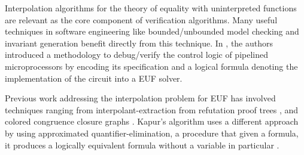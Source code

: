 Interpolation algorithms for the theory of equality 
with uninterpreted functions are relevant as the core 
component of verification algorithms. Many useful techniques 
in software engineering like bounded/unbounded model 
checking and invariant generation benefit directly from 
this technique. In \cite{10.1007/3-540-58179-0_44}, the 
authors introduced a methodology to debug/verify the 
control logic of pipelined microprocessors by encoding 
its specification and a logical formula denoting the 
implementation of the circuit into a EUF solver.

Previous work addressing the interpolation problem for 
EUF has involved techniques ranging from
interpolant-extraction from refutation proof 
trees \cite{10.1007/978-3-540-24730-2_2, mcmillan2011interpolants, 
10.1007/978-3-642-31612-8_24}, and colored congruence closure
graphs \cite{10.1007/978-3-642-00768-2_34}. Kapur's algorithm 
uses a different approach by using approximated
quantifier-elimination, a procedure that given a formula, 
it produces a logically equivalent formula
 without a variable in particular \cite{DBLP:books/daglib/0076838}.

